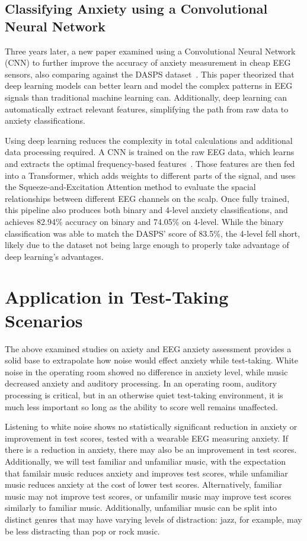 \documentclass[journal]{IEEEtran}
\begin{document}
\subsection{Classifying Anxiety using a Convolutional Neural Network}
Three years later, a new paper examined using a Convolutional Neural Network (CNN) to further improve the accuracy of anxiety measurement in cheap EEG sensors, also comparing against the DASPS dataset~\cite{GhonchiHamidreza2025MMCA}. This paper theorized that deep learning models can better learn and model the complex patterns in EEG signals than traditional machine learning can. Additionally, deep learning can automatically extract relevant features, simplifying the path from raw data to anxiety classifications.

Using deep learning reduces the complexity in total calculations and additional data processing required. A CNN is trained on the raw EEG data, which learns and extracts the optimal frequency-based features~\cite{GhonchiHamidreza2025MMCA}. Those features are then fed into a Transformer, which adds weights to different parts of the signal, and uses the Squeeze-and-Excitation Attention method to evaluate the spacial relationships between different EEG channels on the scalp. Once fully trained, this pipeline also produces both binary and 4-level anxiety classifications, and achieves 82.94\% accuracy on binary and 74.05\% on 4-level. While the binary classification was able to match the DASPS' score of 83.5\%, the 4-level fell short, likely due to the dataset not being large enough to properly take advantage of deep learning's advantages.

\section{Application in Test-Taking Scenarios}
The above examined studies on axiety and EEG anxiety assessment provides a solid base to extrapolate how noise would effect anxiety while test-taking. White noise in the operating room showed no difference in anxiety level, while music decreased anxiety and auditory processing\cite{ShahrokhiShabnam2022Teow, WayT.JustinMD2013EoNo}. In an operating room, auditory processing is critical, but in an otherwise quiet test-taking environment, it is much less important so long as the ability to score well remains unaffected.

Listening to white noise shows no statistically significant reduction in anxiety or improvement in test scores, tested with a wearable EEG measuring anxiety. If there is a reduction in anxiety, there may also be an improvement in test scores. Additionally, we will test familiar and unfamiliar music, with the expectation that familair music reduces anxiety and improves test scores, while unfamiliar music reduces anxiety at the cost of lower test scores. Alternatively, familiar music may not improve test scores, or unfamilir music may improve test scores similarly to familiar music. Additionally, unfamiliar music can be split into distinct genres that may have varying levels of distraction: jazz, for example, may be less distracting than pop or rock music.
\end{document}
